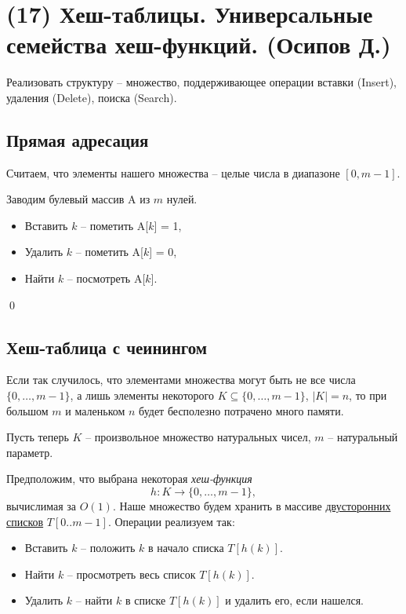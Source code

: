 \section{(17) Хеш-таблицы. Универсальные семейства хеш-функций. (Осипов Д.)}

\begin{problem*}
	Реализовать структуру -- множество, поддерживающее операции вставки (Insert), удаления (Delete), поиска (Search).
\end{problem*}
\subsection{Прямая адресация}
Считаем, что элементы нашего множества -- целые числа в диапазоне $[0, m-1]$.

 Заводим булевый массив A из $m$ нулей.
\begin{itemize}
    \item Вставить $k$ -- пометить A[$k$] = 1,
    \item Удалить $k$ -- пометить A[$k$] = 0,
    \item Найти $k$ -- посмотреть A[$k$].
\end{itemize}\qed

\subsection{Хеш-таблица с чеинингом}
Если так случилось, что элементами множества могут быть не все числа $\{0, \ldots, m-1\}$, а лишь элементы некоторого $K \subseteq \{0, \ldots, m-1\}$, $|K| = n$, то при большом $m$ и маленьком $n$ будет бесполезно потрачено много памяти.

Пусть теперь $K$ -- произвольное множество натуральных чисел, $m$ -- натуральный параметр.


Предположим, что выбрана некоторая \textit{хеш-функция} $$h: K \rightarrow \{0, \ldots, m-1\},$$ вычислимая за $O(1)$. Наше множество будем хранить в массиве \underline{двусторонних списков} $T[0..m-1]$. Операции реализуем так:
\begin{itemize}
    \item Вставить $k$ -- положить $k$ в начало списка $T[h(k)]$.
    \item Найти $k$ -- просмотреть весь список $T[h(k)]$.
    \item Удалить $k$ -- найти $k$ в списке $T[h(k)]$ и удалить его, если нашелся.
\end{itemize}

